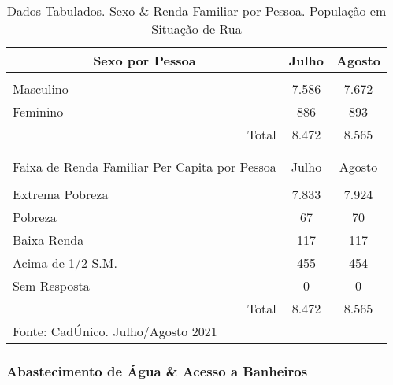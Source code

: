 \documentclass[12pt]{article}
\begin{document}
\begin{table}[htbp]
  \centering
  \caption{Dados Tabulados. Sexo \& Renda Familiar por Pessoa. População em Situação de Rua}
    \begin{tabular}{p{23.5em}rr}
    \hline
    \multicolumn{1}{c}{Sexo por Pessoa} & \multicolumn{1}{c}{Julho} & \multicolumn{1}{c}{Agosto} \\
    \midrule
    \multicolumn{1}{r}{} &      &  \\
    \multicolumn{1}{l}{Masculino} & \multicolumn{1}{c}{7.586} & \multicolumn{1}{c}{7.672} \\
    \multicolumn{1}{l}{Feminino} & \multicolumn{1}{c}{886} & \multicolumn{1}{c}{893} \\
    \midrule
    \multicolumn{1}{r}{Total} & \multicolumn{1}{c}{8.472} & \multicolumn{1}{c}{8.565} \\
    \midrule
    \multicolumn{1}{r}{} &      &  \\
    \multicolumn{1}{r}{} &      &  \\
    \midrule
    \multicolumn{1}{c}{Faixa de Renda Familiar Per Capita por Pessoa} & \multicolumn{1}{c}{Julho} & \multicolumn{1}{c}{Agosto} \\
    \midrule
    \multicolumn{1}{r}{} &      &  \\
    \multicolumn{1}{l}{Extrema Pobreza} & \multicolumn{1}{c}{7.833} & \multicolumn{1}{c}{7.924} \\
    \multicolumn{1}{l}{Pobreza} & \multicolumn{1}{c}{67} & \multicolumn{1}{c}{70} \\
    \multicolumn{1}{l}{Baixa Renda} & \multicolumn{1}{c}{117} & \multicolumn{1}{c}{117} \\
    \multicolumn{1}{l}{Acima de 1/2 S.M.} & \multicolumn{1}{c}{455} & \multicolumn{1}{c}{454} \\
    \multicolumn{1}{l}{Sem Resposta} & \multicolumn{1}{c}{0} & \multicolumn{1}{c}{0} \\
    \midrule
    \multicolumn{1}{r}{Total} & \multicolumn{1}{c}{8.472} & \multicolumn{1}{c}{8.565} \\
    \midrule
    Fonte: CadÚnico. Julho/Agosto 2021 &      &  \\
    \end{tabular}%
  \label{tab:tab3}%
\end{table}%

\subsubsection{Abastecimento de Água \& Acesso a Banheiros}
\end{document}
